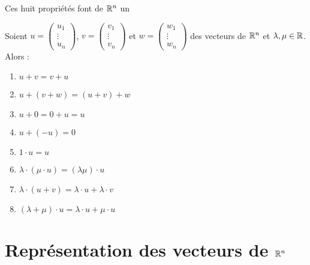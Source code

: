 \begin{frame}
\end{frame}


\begin{frame}
Ces huit propriétés font de $\mathbb{R}^n$ un 
\begin{theoreme}
  Soient $u = \left(\begin{smallmatrix} u_1\\ \vdots \\ u_n \end{smallmatrix}\right)$, $v = \left(\begin{smallmatrix} v_1\\ \vdots \\ v_n \end{smallmatrix}\right)$
  et $w = \left(\begin{smallmatrix} w_1\\ \vdots \\ w_n \end{smallmatrix}\right)$ des vecteurs de $\mathbb{R}^n$
  et $\lambda, \mu \in \mathbb{R}$.  
  Alors :\pause
 \begin{enumerate}[<+->]
 \item $u + v = v + u$
 \item $u + (v+w) = (u+v) +w$
 \item $u + 0 = 0 + u = u$
 \item $u + (-u) = 0$
 \item $1 \cdot u = u$ 
 \item $\lambda \cdot (\mu \cdot u) = (\lambda\mu )\cdot u$
 \item $\lambda \cdot (u+v) = \lambda \cdot u + \lambda \cdot v$
 \item $(\lambda + \mu ) \cdot u = \lambda \cdot u + \mu \cdot u$
 \end{enumerate} 
\end{theoreme}
\end{frame}

 
\begin{frame}
\end{frame}


\section{Représentation des vecteurs de $\mathbb{R}^n$}

